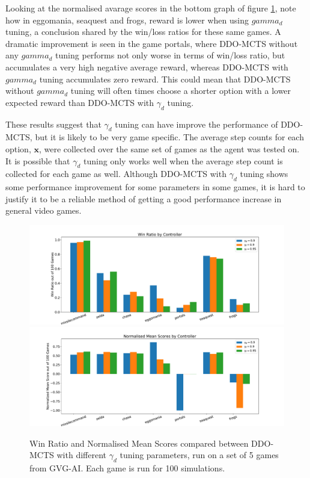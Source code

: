 \documentclass[12pt,a4paper]{article}
\begin{document}
\begin{multicols}{2}
Looking at the normalised avarage scores in the bottom graph of figure \ref{fig:extens-res}, note how in eggomania, seaquest and frogs, reward is lower when using $gamma_d$ tuning, a conclusion shared by the win/loss ratios for these same games. A dramatic improvement is seen in the game portals, where DDO-MCTS without any $gamma_d$ tuning performs not only worse in terms of win/loss ratio, but accumulates a very high negative average reward, whereas DDO-MCTS with $gamma_d$ tuning accumulates zero reward. This could mean that DDO-MCTS without $gamma_d$ tuning will often times choose a shorter option with a lower expected reward than DDO-MCTS with $\gamma_d$ tuning.

These results suggest that $\gamma_d$ tuning can have improve the performance of DDO-MCTS, but it is likely to be very game specific. The average step counts for each option, $\mathbf{x}$, were collected over the same set of games as the agent was tested on. It is possible that $\gamma_d$ tuning only works well when the average step count is collected for each game as well. Although DDO-MCTS with $\gamma_d$ tuning shows some performance improvement for some parameters in some games, it is hard to justify it to be a reliable method of getting a good performance increase in general video games. 

\begin{figure}
    \centering
    \includegraphics[width=\linewidth]{win_ratio_gamma.pdf}
    \includegraphics[width=\linewidth]{mean_scores_gamma.pdf}
    \caption{Win Ratio and Normalised Mean Scores compared between DDO-MCTS with different $\gamma_d$ tuning parameters, run on a set of 5 games from GVG-AI. Each game is run for 100 simulations.}
    \label{fig:extens-res}
\end{figure}


\end{multicols}
\end{document}
